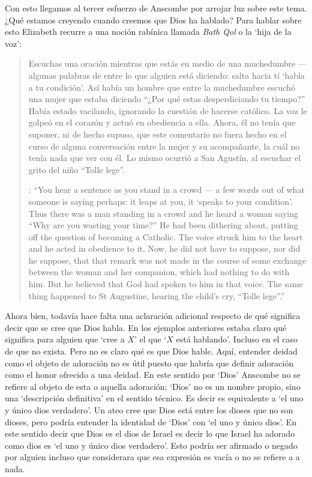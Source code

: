 Con esto llegamos al tercer esfuerzo de Anscombe por arrojar luz sobre este tema. ¿Qué estamos creyendo cuando creemos que Dios ha hablado? Para hablar sobre esto Elizabeth recurre a una noción rabínica llamada \emph{Bath Qol} o la `hija de la voz': \blockquote[{\cite[118--119]{anscombe1981erp:faith}}: \enquote{You hear a sentence as you stand in a crowd --- a few words out of what someone is saying perhaps: it leaps at you, it `speaks to your condition'. Thus there was a man standing in a crowd and he heard a woman saying ``Why are you wasting your time?'' He had been dithering about, putting off the question of becoming a Catholic. The voice struck him to the heart and he acted in obedience to it. Now, he did not have to suppose, nor did he suppose, that that remark was not made in the course of some exchange between the woman and her companion, which had nothing to do with him. But he believed that God had spoken to him in that voice. The same thing happened to St Augustine, hearing the child's cry, ``Tolle lege''.}]{Escuchas una oración mientras que estás en medio de una muchedumbre --- algunas palabras de entre lo que alguien está diciendo: salta hacia tí `habla a tu condición'. Así había un hombre que entre la muchedumbre escuchó una mujer que estaba diciendo ``¿Por qué estas desperdiciando tu tiempo?'' Había estado vacilando, ignorando la cuestión de hacerse católico. La voz le golpeó en el corazón y actuó en obediencia a ella. Ahora, él no tenía que suponer, ni de hecho supuso, que este comentario no fuera hecho en el curso de alguna conversación entre la mujer y su acompañante, la cuál no tenía nada que ver con él. Lo mismo ocurrió a San Agustín, al escuchar el grito del niño ``Tolle lege''.}

Ahora bien, todavía hace falta una aclaración adicional respecto de qué significa decir que se cree que Dios habla. En los ejemplos anteriores estaba claro qué significa para alguien que \enquote*{cree a $X$} el que \enquote*{$X$ está hablando}. Incluso en el caso de que no exista. Pero no es claro qué es que Dios hable. Aquí, entender deidad como el objeto de adoración no es útil puesto que habría que definir adoración como el honor ofrecido a una deidad. En este sentido por `Dios' Anscombe no se refiere al objeto de esta o aquella adoración; `Dios' no es un nombre propio, sino una `descripción definitiva' en el sentido técnico. Es decir es equivalente a `el uno y único dios verdadero'. Un ateo cree que Dios está entre los dioses que no son dioses, pero podría entender la identidad de `Dios' con `el uno y único dios'. En este sentido decir que Dios es el dios de Israel es decir lo que Israel ha adorado como dios es `el uno y único dios verdadero'. Esto podría ser afirmado o negado por alguien incluso que considerara que esa expresión es vacía o no se refiere a a nada.


